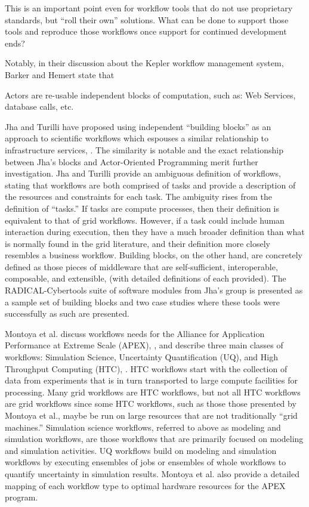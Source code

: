 This is an important point even for workflow tools that do not use
proprietary standards, but ``roll their own'' solutions. What can be
done to support those tools and reproduce those workflows once support
for continued development ends?

Notably, in their discussion about the Kepler workflow management
system, Barker and Hemert state that

\begin{displayquote}
Actors are re-usable independent blocks of computation, such as:
Web Services, database calls, etc.
\end{displayquote}

Jha and Turilli have proposed using independent ``building blocks'' as
an approach to scientific workflows which espouses a similar
relationship to infrastructure services, \cite{jha_building_2016}. The
similarity is notable and the exact relationship between Jha's blocks and
Actor-Oriented Programming merit further investigation. 
Jha and Turilli provide an ambiguous definition of workflows, stating
that workflows are both comprised of tasks and provide a description of
the resources and constraints for each task. The ambiguity rises from
the definition of ``tasks.'' If tasks are compute processes, then their
definition is equivalent to that of grid workflows. However, if a task
could include human interaction during execution, then they have a much
broader definition than what is normally found in the grid literature,
and their definition more closely resembles a business workflow.
Building blocks, on the other hand, are concretely defined as those
pieces of middleware that are self-sufficient, interoperable,
composable, and extensible, (with detailed definitions of each
provided). The RADICAL-Cybertools suite of software modules from Jha's
group is presented as a sample set of building blocks and two case
studies where these tools were successfully as such are presented.

Montoya et al. discuss workflows needs for the Alliance for Application
Performance at Extreme Scale (APEX), \cite{nersc_apex_2016}, and describe
three main classes of workflows: Simulation Science, Uncertainty
Quantification (UQ), and High Throughput Computing (HTC),
\cite{montoya_apex_2016}.
HTC workflows start with the collection of data from experiments that is in turn transported to large compute facilities for
processing. Many grid workflows are HTC workflows, but not all HTC
workflows are grid workflows since some HTC workflows, such as those
those presented by Montoya et al., maybe be run on large resources that
are not traditionally ``grid machines.'' Simulation science workflows,
referred to above as modeling and simulation workflows, are those
workflows that are primarily focused on modeling and simulation
activities. UQ workflows build on modeling and simulation workflows by
executing ensembles of jobs or ensembles of whole workflows to quantify
uncertainty in simulation results. Montoya et al. also provide a detailed
mapping of each workflow type to optimal hardware resources for the APEX
program.

